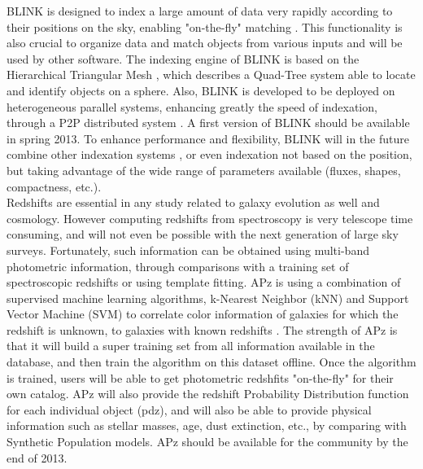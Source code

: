 BLINK is designed to index a large amount of data very rapidly according to their positions on the sky, enabling "on-the-fly" matching \citep{blink}. This functionality is also crucial to organize data and match objects from various inputs and will be used by other software. The indexing engine of BLINK is based on the Hierarchical Triangular Mesh \citep[HTM -][]{htm}, which describes a Quad-Tree system able to locate and identify objects on a sphere. Also, BLINK is developed to be deployed on heterogeneous parallel systems, enhancing greatly the speed of indexation, through a P2P distributed system \citep[c.f.][]{tang10}. A first version of BLINK should be available in spring 2013. To enhance performance and flexibility, BLINK will in the future combine other indexation systems \citep[HEALPix -][]{healpix}, or even indexation not based on the position, but taking advantage of the wide range of parameters available (fluxes, shapes, compactness, etc.).\\

Redshifts are essential in any study related to galaxy evolution as well and cosmology. However computing redshifts from spectroscopy is very telescope time consuming, and will not even be possible with the next generation of large sky surveys. Fortunately, such information can be obtained using multi-band photometric information, through comparisons with a training set of spectroscopic redshifts or using template fitting. APz is using a combination of supervised machine learning algorithms, k-Nearest Neighbor (kNN) and Support Vector Machine (SVM) to correlate color information of galaxies for which the redshift is unknown, to galaxies with known redshifts \citep[refer to e.g.,][]{bb10}. The strength of APz is that it will build a super training set from all information available in the database, and then train the algorithm on this dataset offline. Once the algorithm is trained, users will be able to get photometric redshfits "on-the-fly" for their own catalog. APz will also provide the redshift Probability Distribution function for each individual object (pdz), and will also be able to provide physical information such as stellar masses, age, dust extinction, etc., by comparing with Synthetic Population models. APz should be available for the community by the end of 2013.\\

